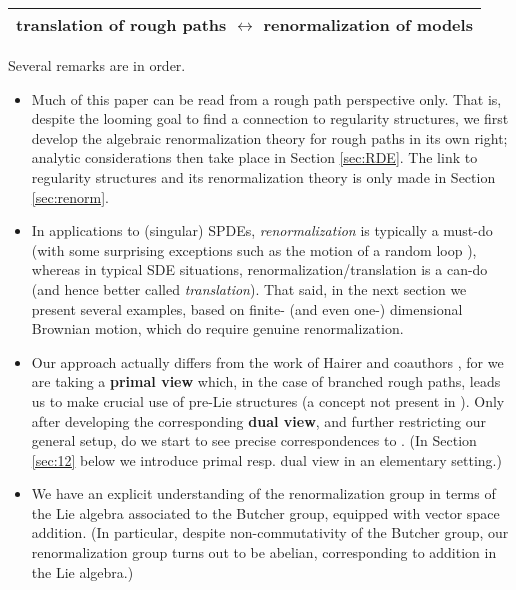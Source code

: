 \documentclass{article}
\begin{document}
\begin{table}[!htbp]
\centering
\begin{tabular}{|l|}
\hline
   translation of rough paths $\longleftrightarrow$ renormalization of models \\ \hline
\end{tabular}
\end{table}


Several remarks are in order. 

\begin{itemize}
\item Much of this paper can be read from a rough path perspective only.
That is, despite the looming goal to find a connection to regularity
structures, we first develop the algebraic renormalization theory for rough paths
in its own right; analytic considerations then take place in Section \ref{sec:RDE}. 
The link to regularity structures and its renormalization
theory is only made in Section \ref{sec:renorm}.

\item  In applications to (singular) SPDEs, {\it renormalization} is typically a must-do (with some surprising exceptions such as the motion of a random loop \cite{Hairer16}),
whereas in typical SDE situations, renormalization/translation is a can-do (and hence better called {\it translation}). That said, in the next section we present several examples, 
based on finite- (and even one-) dimensional Brownian motion, which do require genuine renormalization. 


\item Our approach actually differs from the work of Hairer and coauthors \cite{Hairer14,BHZ16}, for
we are taking a \textbf{primal view }which, in the case of branched rough paths,
leads us to make crucial use of pre-Lie structures (a concept not present in
\cite{BHZ16}). Only after developing the corresponding \textbf{dual view}, and
further restricting our general setup, do we start to see precise
correspondences to \cite{BHZ16}. (In Section \ref{sec:12} below we introduce
primal resp. dual view in an elementary setting.) 

\item We have an explicit understanding of the renormalization group in
terms of the Lie algebra associated to the Butcher group, equipped with
vector space addition. (In particular, despite non-commutativity of the
Butcher group, our renormalization group turns out to be abelian, corresponding to addition in the Lie algebra.)


\end{itemize}
\end{document}
